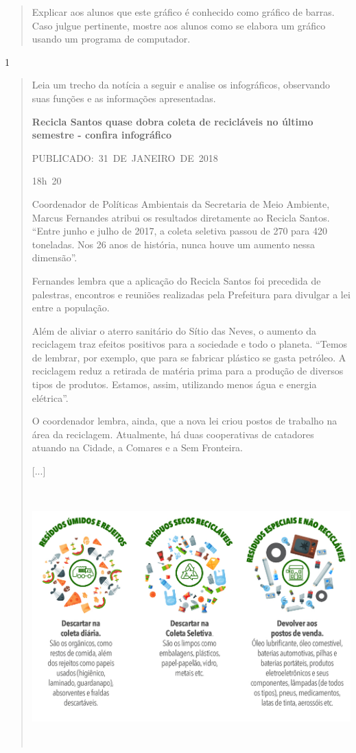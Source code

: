 \begin{itemize}
{{{\begin{itemize}
\begin{itemize}
\begin{itemize}
\begin{quote}
Explicar aos alunos que este gráfico é conhecido como gráfico de barras.
Caso julgue pertinente, mostre aos alunos como se elabora um gráfico
usando um programa de computador.
\end{quote}

\num{1}

\begin{quote}
Leia um trecho da notícia a seguir e analise os infográficos, observando
suas funções e as informações apresentadas.

\textbf{Recicla Santos quase dobra coleta de recicláveis no último
semestre - confira infográfico}

PUBLICADO:~31~DE~JANEIRO~DE~2018~

18h~20

Coordenador de Políticas Ambientais da Secretaria de Meio Ambiente,
Marcus Fernandes atribui os resultados diretamente ao Recicla Santos.
``Entre junho e julho de 2017, a coleta seletiva passou de 270 para 420
toneladas. Nos 26 anos de história, nunca houve um aumento nessa
dimensão''.

Fernandes lembra que a aplicação do Recicla Santos foi precedida de
palestras, encontros e reuniões realizadas pela Prefeitura para divulgar
a lei entre a população.

Além de aliviar o aterro sanitário do Sítio das Neves, o aumento da
reciclagem traz efeitos positivos para a sociedade e todo o planeta.
``Temos de lembrar, por exemplo, que para se fabricar plástico se gasta
petróleo. A reciclagem reduz a retirada de matéria prima para a produção
de diversos tipos de produtos. Estamos, assim, utilizando menos água e
energia elétrica''.

O coordenador lembra, ainda, que a nova lei criou postos de trabalho na
área da reciclagem. Atualmente, há duas cooperativas de catadores
atuando na Cidade, a Comares e a Sem Fronteira.

{[}...{]}

\includegraphics[width=5.90556in,height=3.90764in]{media/image30.jpeg}


\end{quote}
\end{itemize}
\end{itemize}
\end{itemize}}}}
\end{itemize}

